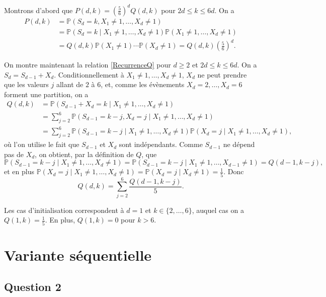 \documentclass[a4paper,11pt]{amsart}
\theoremstyle{plain}
\begin{document}
Montrons d'abord que $P(d, k) = \left(\frac{5}{6}\right)^d Q(d, k)$ pour $2d \leq k \leq 6d$. On a
\begin{align*}
P(d, k) & = \mathbb P(S_d = k, X_1 \neq 1, \dotsc, X_d \neq 1) \\
& = \mathbb P(S_d = k \mid X_1 \neq 1, \dotsc, X_d \neq 1) \mathbb P(X_1 \neq 1, \dotsc, X_d \neq 1) \\
& = Q(d, k) \mathbb P(X_1 \neq 1) \dotsm \mathbb P(X_d \neq 1) = Q(d, k) \left(\tfrac{5}{6}\right)^d.
\end{align*}

On montre maintenant la relation \eqref{RecurrenceQ} pour $d \geq 2$ et $2d \leq k \leq 6d$. On a $S_d = S_{d-1} + X_d$. Conditionnellement à $X_1 \neq 1, \dotsc, X_d \neq 1$, $X_d$ ne peut prendre que les valeurs $j$ allant de $2$ à $6$, et, comme les évènements $X_d = 2, \dotsc, X_d = 6$ forment une partition, on a
\begin{align*}
Q(d, k) & = \mathbb P(S_{d-1} + X_d = k \mid X_1 \neq 1, \dotsc, X_d \neq 1) \\
& = \sum_{j=2}^6 \mathbb P(S_{d-1} = k-j, X_d = j \mid X_1 \neq 1, \dotsc, X_d \neq 1) \\
& = \sum_{j=2}^6 \mathbb P(S_{d-1} = k-j \mid X_1 \neq 1, \dotsc, X_d \neq 1)\mathbb P(X_d = j \mid X_1 \neq 1, \dotsc, X_d \neq 1),
\end{align*}
où l'on utilise le fait que $S_{d-1}$ et $X_d$ sont indépendants. Comme $S_{d-1}$ ne dépend pas de $X_d$, on obtient, par la définition de $Q$, que
\[\mathbb P(S_{d-1} = k-j \mid X_1 \neq 1, \dotsc, X_d \neq 1) = \mathbb P(S_{d-1} = k-j \mid X_1 \neq 1, \dotsc, X_{d-1} \neq 1) = Q(d-1, k-j),\]
et en plus $\mathbb P(X_d = j \mid X_1 \neq 1, \dotsc, X_d \neq 1) = \mathbb P(X_d = j \mid X_d \neq 1) = \frac{1}{5}$. Donc
\begin{equation*}
Q(d, k) = \sum_{j=2}^6 \frac{Q(d-1, k-j)}{5}.
\end{equation*}

Les cas d'initialisation correspondent à $d = 1$ et $k \in \{2, \dotsc, 6\}$, auquel cas on a $Q(1, k) = \frac{1}{5}$. En plus, $Q(1, k) = 0$ pour $k > 6$.

\section{Variante séquentielle}

\subsection{Question 2}
\end{document}
